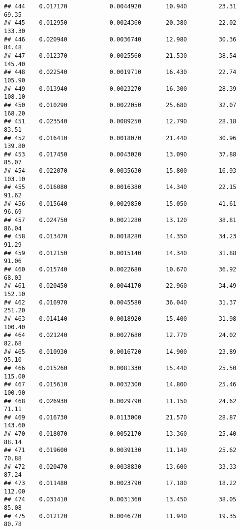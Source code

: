 \documentclass[
]{article}
\begin{document}
\begin{verbatim}
## 444    0.017170            0.0044920       10.940         23.31           69.35
## 445    0.012950            0.0024360       20.380         22.02          133.30
## 446    0.020940            0.0036740       12.980         30.36           84.48
## 447    0.012370            0.0025560       21.530         38.54          145.40
## 448    0.022540            0.0019710       16.430         22.74          105.90
## 449    0.013940            0.0023270       16.300         28.39          108.10
## 450    0.010290            0.0022050       25.680         32.07          168.20
## 451    0.023540            0.0089250       12.790         28.18           83.51
## 452    0.016410            0.0018070       21.440         30.96          139.80
## 453    0.017450            0.0043020       13.090         37.88           85.07
## 454    0.022070            0.0035630       15.800         16.93          103.10
## 455    0.016080            0.0016380       14.340         22.15           91.62
## 456    0.015640            0.0029850       15.050         41.61           96.69
## 457    0.024750            0.0021280       13.120         38.81           86.04
## 458    0.013470            0.0018280       14.350         34.23           91.29
## 459    0.012150            0.0015140       14.340         31.88           91.06
## 460    0.015740            0.0022680       10.670         36.92           68.03
## 461    0.020450            0.0044170       22.960         34.49          152.10
## 462    0.016970            0.0045580       36.040         31.37          251.20
## 463    0.014140            0.0018920       15.400         31.98          100.40
## 464    0.021240            0.0027680       12.770         24.02           82.68
## 465    0.010930            0.0016720       14.900         23.89           95.10
## 466    0.015260            0.0081330       15.440         25.50          115.00
## 467    0.015610            0.0032300       14.800         25.46          100.90
## 468    0.026930            0.0029790       11.150         24.62           71.11
## 469    0.016730            0.0113000       21.570         28.87          143.60
## 470    0.018070            0.0052170       13.360         25.40           88.14
## 471    0.019600            0.0039130       11.140         25.62           70.88
## 472    0.020470            0.0038830       13.600         33.33           87.24
## 473    0.011480            0.0023790       17.180         18.22          112.00
## 474    0.031410            0.0031360       13.450         38.05           85.08
## 475    0.012120            0.0046720       11.940         19.35           80.78

\end{verbatim}
\end{document}
